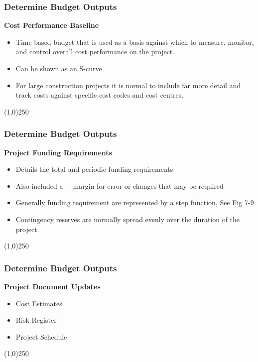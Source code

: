 \begin{frame}
\frametitle{Determine Budget \hfill\hfill Outputs}
\textbf{Cost Performance Baseline}
\begin{itemize}
	\item Time based budget that is used as a basis against which to measure, monitor, and control overall cost performance on the project.
	\item Can be shown as an S-curve
	\item For large construction projects it is normal to include far more detail and track costs against specific cost codes and cost centres.
\end{itemize}
\end{frame}
\begin{center}\line(1,0){250}\end{center}






\begin{frame}
\frametitle{Determine Budget \hfill\hfill Outputs}

\textbf{Project Funding Requirements}
\begin{itemize}
	\item Details the total and periodic funding requirements
	\item Also included a $\pm$ margin for error or changes that may be required
	\item Generally funding requirement are represented by a step function, See Fig 7-9
	\item Contingency reserves are normally spread evenly over the duration of the project.  
\end{itemize}
\end{frame}
\begin{center}\line(1,0){250}\end{center}







\begin{frame}
\frametitle{Determine Budget \hfill\hfill Outputs}
\textbf{Project Document Updates}
\begin{itemize}
	\item Cost Estimates
	\item Risk Register
	\item Project Schedule
\end{itemize}
\end{frame}
\begin{center}\line(1,0){250}\end{center}







